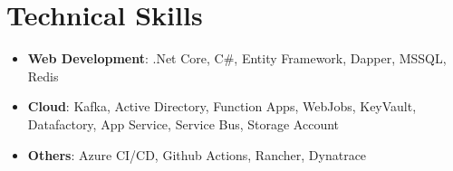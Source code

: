 \section{\textbf{Technical Skills}}
\begin{itemize}
    \small
    \setlength{\itemsep}{0pt}
    \setlength{\parskip}{0pt}
    \setlength{\parsep}{0pt}
    \item \textbf{Web Development}: .Net Core, C\#, Entity Framework, Dapper, MSSQL, Redis
    \item \textbf{Cloud}: Kafka, Active Directory, Function Apps, WebJobs, KeyVault, Datafactory, App Service, Service Bus, Storage Account
    \item \textbf{Others}: Azure CI/CD, Github Actions, Rancher, Dynatrace
\end{itemize}
